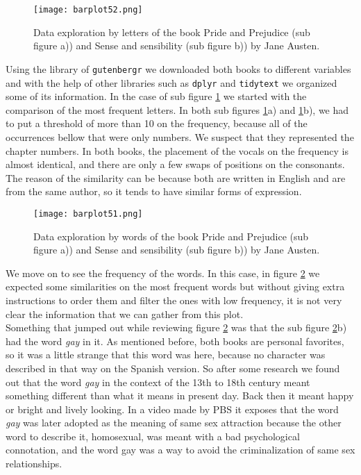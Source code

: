 \documentclass{article}
\begin{document}
\begin{figure}[htp]
	\centering
	\texttt{[image: barplot52.png]}
	\caption{Data exploration by letters of the book Pride and Prejudice (sub figure a)) and Sense and sensibility (sub figure b)) by Jane Austen.}\label{fig1}
\end{figure}

Using the library of \texttt{gutenbergr} we downloaded both books to different variables and with the help of other libraries such as \texttt{dplyr} and \texttt{tidytext} we organized some of its information. In the case of sub figure \ref{fig1} we started with the comparison of the most frequent letters. In both sub figures \ref{fig1}a) and \ref{fig1}b), we had to put a threshold of more than 10 on the frequency, because all of the occurrences bellow that were only numbers. We suspect that they represented the chapter numbers. In both books, the placement of the vocals on the frequency is almost identical, and there are only a few swaps of positions on the consonants. The reason of the similarity can be because both are written in English and are from the same author, so it tends to have similar forms of expression.\\

\begin{figure}[htp]
	\centering
	\texttt{[image: barplot51.png]}
	\caption{Data exploration by words of the book Pride and Prejudice (sub figure a)) and Sense and sensibility (sub figure b)) by Jane Austen.}\label{fig2}
\end{figure}

We move on to see the frequency of the words. In this case, in figure \ref{fig2} we expected some similarities on the most frequent words but without giving extra instructions to order them and filter the ones with low frequency, it is not very clear the information that we can gather from this plot. \\

Something that jumped out while reviewing figure \ref{fig2} was that the sub figure \ref{fig2}b) had the word \textit{gay} in it. As mentioned before, both books are personal favorites, so it was a little strange that this word was here, because no character was described in that way on the Spanish version. So after some research we found out that the word \textit{gay} in the context of the 13th to 18th century meant something different than what it means in present day. Back then it meant happy or bright and lively looking. In a video made by PBS \cite{pbs} it exposes that the word \textit{gay} was later adopted as the meaning of same sex attraction because the other word to describe it, homosexual, was meant with a bad psychological connotation, and the word gay was a way to avoid the criminalization of same sex relationships.\\
\end{document}
